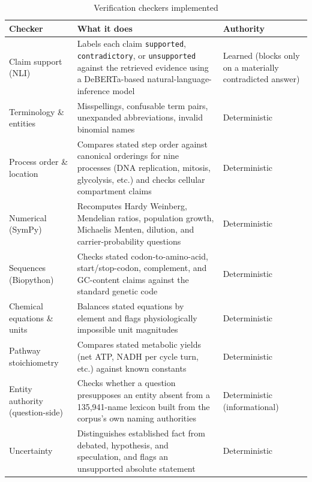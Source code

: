 \begin{table}[h]
\centering
\caption{Verification checkers implemented}
\label{tab:3.2}
\footnotesize
\begin{tabularx}{\textwidth}{@{}p{3.4cm} X p{2.2cm}@{}}
\toprule
\textbf{Checker} & \textbf{What it does} & \textbf{Authority} \\
\midrule
Claim support (NLI) & Labels each claim \texttt{supported}, \texttt{contradictory}, or \texttt{unsupported} against the retrieved evidence using a DeBERTa-based natural-language-inference model \cite{he2021deberta} & Learned (blocks only on a materially contradicted answer) \\
\addlinespace[3pt]
Terminology \& entities & Misspellings, confusable term pairs, unexpanded abbreviations, invalid binomial names & Deterministic \\
\addlinespace[3pt]
Process order \& location & Compares stated step order against canonical orderings for nine processes (DNA replication, mitosis, glycolysis, etc.) and checks cellular compartment claims & Deterministic \\
\addlinespace[3pt]
Numerical (SymPy) & Recomputes Hardy Weinberg, Mendelian ratios, population growth, Michaelis Menten, dilution, and carrier-probability questions \cite{meurer2017sympy} & Deterministic \\
\addlinespace[3pt]
Sequences (Biopython) & Checks stated codon-to-amino-acid, start/stop-codon, complement, and GC-content claims against the standard genetic code \cite{cock2009biopython} & Deterministic \\
\addlinespace[3pt]
Chemical equations \& units & Balances stated equations by element and flags physiologically impossible unit magnitudes & Deterministic \\
\addlinespace[3pt]
Pathway stoichiometry & Compares stated metabolic yields (net ATP, NADH per cycle turn, etc.) against known constants & Deterministic \\
\addlinespace[3pt]
Entity authority (question-side) & Checks whether a question presupposes an entity absent from a 135{,}941-name lexicon built from the corpus's own naming authorities & Deterministic (informational) \\
\addlinespace[3pt]
Uncertainty & Distinguishes established fact from debated, hypothesis, and speculation, and flags an unsupported absolute statement & Deterministic \\
\bottomrule
\end{tabularx}
\end{table}

